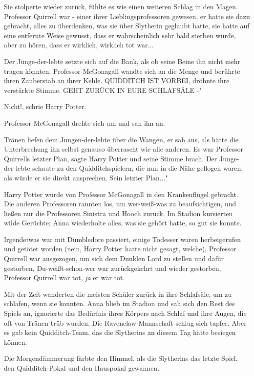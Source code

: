 Sie stolperte wieder zurück, fühlte es wie einen weiteren Schlag in den Magen.
Professor Quirrell war - einer ihrer Lieblingsprofessoren gewesen, er hatte sie
dazu gebracht, alles zu überdenken, was sie über Slytherin geglaubt hatte, sie
hatte auf eine entfernte Weise gewusst, dass er wahrscheinlich sehr bald sterben
würde, aber zu hören, dass er wirklich, wirklich tot war...

Der Junge-der-lebte setzte sich auf die Bank, als ob seine Beine ihn nicht mehr
tragen könnten. Professor McGonagall wandte sich an die Menge und berührte ihren
Zauberstab an ihrer Kehle. \glqq{}QUIDDITCH IST VORBEI\grqq{}, dröhnte ihre
verstärkte Stimme. \glqq{}GEHT ZURÜCK IN EURE SCHLAFSÄLE -"

\glqq{}Nicht!\grqq{}, schrie Harry Potter.

Professor McGonagall drehte sich um und sah ihn an.

Tränen liefen dem Jungen-der-lebte über die Wangen, er sah aus, als hätte die
Unterbrechung ihn selbst genauso überrascht wie alle anderen. \glqq{}Es war
Professor Quirrells letzter Plan\grqq{}, sagte Harry Potter und seine Stimme
brach. Der Junge-der-lebte schaute zu den Quidditchspielern, die nun in die Nähe
geflogen waren, als würde er sie direkt ansprechen. \glqq{}Sein letzter Plan..."

Harry Potter wurde von Professor McGonagall in den Krankenflügel gebracht. Die
anderen Professoren rannten los, um wer-weiß-was zu beaufsichtigen, und ließen
nur die Professoren Sinistra und Hooch zurück. Im Stadion kursierten wilde
Gerüchte; Anna wiederholte alles, was sie gehört hatte, so gut sie konnte.

Irgendetwas war mit Dumbledore passiert, einige Todesser waren herbeigerufen und
getötet worden (nein, Harry Potter hatte nicht gesagt, welche), Professor
Quirrell war ausgezogen, um sich dem Dunklen Lord zu stellen und dafür
gestorben, Du-weißt-schon-wer war zurückgekehrt und wieder gestorben, Professor
Quirrell war tot, \emph{ja} er war tot.

Mit der Zeit wanderten die meisten Schüler zurück in ihre Schlafsäle, um zu
schlafen, wenn sie konnten. Anna blieb im Stadion und sah sich den Rest des
Spiels an, ignorierte das Bedürfnis ihres Körpers nach Schlaf und ihre Augen,
die oft von Tränen trüb wurden. Die Ravenclaw-Mannschaft schlug sich tapfer.
Aber es gab kein Quidditch-Team, das die Slytherins an diesem Tag hätte besiegen
können.

Die Morgendämmerung färbte den Himmel, als die Slytherins das letzte Spiel, den
Quidditch-Pokal und den Hauspokal gewannen.

